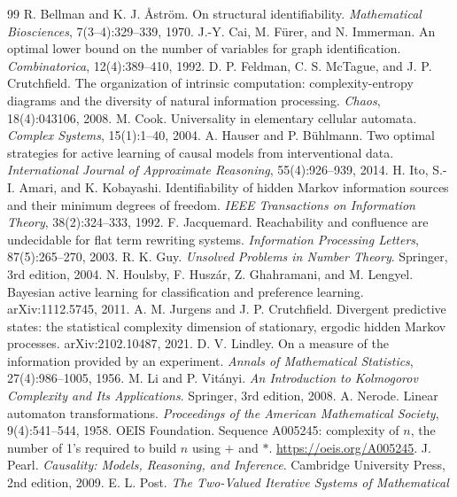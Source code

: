 \documentclass[11pt]{article}
\begin{document}
\begin{thebibliography}{99}
 R. Bellman and K. J. {\AA}str\"om. On structural identifiability.
\emph{Mathematical Biosciences}, 7(3--4):329--339, 1970.
 J.-Y. Cai, M. F\"urer, and N. Immerman. An optimal lower bound on the
number of variables for graph identification. \emph{Combinatorica}, 12(4):389--410, 1992.
 D. P. Feldman, C. S. McTague, and J. P. Crutchfield. The
organization of intrinsic computation: complexity-entropy diagrams and the diversity of
natural information processing. \emph{Chaos}, 18(4):043106, 2008.
 M. Cook. Universality in elementary cellular automata.
\emph{Complex Systems}, 15(1):1--40, 2004.
 A. Hauser and P. B\"uhlmann. Two optimal strategies for active
learning of causal models from interventional data. \emph{International Journal of
Approximate Reasoning}, 55(4):926--939, 2014.
 H. Ito, S.-I. Amari, and K. Kobayashi. Identifiability of hidden Markov
information sources and their minimum degrees of freedom. \emph{IEEE Transactions on
Information Theory}, 38(2):324--333, 1992.
 F. Jacquemard. Reachability and confluence are undecidable for
flat term rewriting systems. \emph{Information Processing Letters}, 87(5):265--270, 2003.
 R. K. Guy. \emph{Unsolved Problems in Number Theory}. Springer, 3rd
edition, 2004.
 N. Houlsby, F. Husz\'ar, Z. Ghahramani, and M. Lengyel. Bayesian
active learning for classification and preference learning. arXiv:1112.5745, 2011.
 A. M. Jurgens and J. P. Crutchfield. Divergent predictive states:
the statistical complexity dimension of stationary, ergodic hidden Markov processes.
arXiv:2102.10487, 2021.
 D. V. Lindley. On a measure of the information provided by an
experiment. \emph{Annals of Mathematical Statistics}, 27(4):986--1005, 1956.
 M. Li and P. Vit\'anyi. \emph{An Introduction to Kolmogorov
Complexity and Its Applications}. Springer, 3rd edition, 2008.
 A. Nerode. Linear automaton transformations.
\emph{Proceedings of the American Mathematical Society}, 9(4):541--544, 1958.
 OEIS Foundation. Sequence A005245: complexity of $n$, the number
of 1's required to build $n$ using $+$ and $*$. \url{https://oeis.org/A005245}.
 J. Pearl. \emph{Causality: Models, Reasoning, and Inference}.
Cambridge University Press, 2nd edition, 2009.
 E. L. Post. \emph{The Two-Valued Iterative Systems of Mathematical
}
\end{thebibliography}
\end{document}
